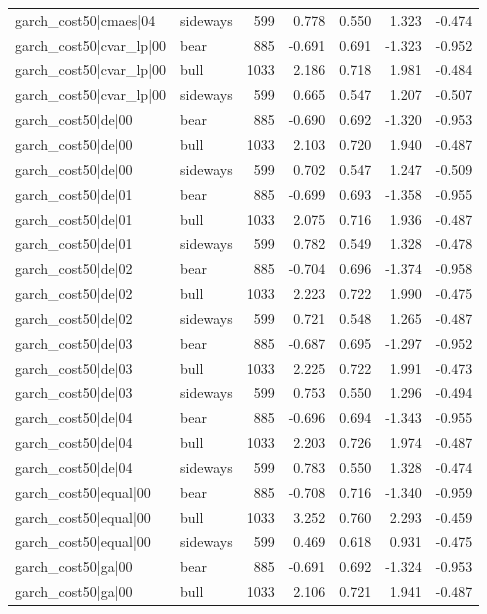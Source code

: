 \begin{table}
\begin{tabular}{llrrrrr}
garch\_cost50|cmaes|04 & sideways & 599 & 0.778 & 0.550 & 1.323 & -0.474 \\
garch\_cost50|cvar\_lp|00 & bear & 885 & -0.691 & 0.691 & -1.323 & -0.952 \\
garch\_cost50|cvar\_lp|00 & bull & 1033 & 2.186 & 0.718 & 1.981 & -0.484 \\
garch\_cost50|cvar\_lp|00 & sideways & 599 & 0.665 & 0.547 & 1.207 & -0.507 \\
garch\_cost50|de|00 & bear & 885 & -0.690 & 0.692 & -1.320 & -0.953 \\
garch\_cost50|de|00 & bull & 1033 & 2.103 & 0.720 & 1.940 & -0.487 \\
garch\_cost50|de|00 & sideways & 599 & 0.702 & 0.547 & 1.247 & -0.509 \\
garch\_cost50|de|01 & bear & 885 & -0.699 & 0.693 & -1.358 & -0.955 \\
garch\_cost50|de|01 & bull & 1033 & 2.075 & 0.716 & 1.936 & -0.487 \\
garch\_cost50|de|01 & sideways & 599 & 0.782 & 0.549 & 1.328 & -0.478 \\
garch\_cost50|de|02 & bear & 885 & -0.704 & 0.696 & -1.374 & -0.958 \\
garch\_cost50|de|02 & bull & 1033 & 2.223 & 0.722 & 1.990 & -0.475 \\
garch\_cost50|de|02 & sideways & 599 & 0.721 & 0.548 & 1.265 & -0.487 \\
garch\_cost50|de|03 & bear & 885 & -0.687 & 0.695 & -1.297 & -0.952 \\
garch\_cost50|de|03 & bull & 1033 & 2.225 & 0.722 & 1.991 & -0.473 \\
garch\_cost50|de|03 & sideways & 599 & 0.753 & 0.550 & 1.296 & -0.494 \\
garch\_cost50|de|04 & bear & 885 & -0.696 & 0.694 & -1.343 & -0.955 \\
garch\_cost50|de|04 & bull & 1033 & 2.203 & 0.726 & 1.974 & -0.487 \\
garch\_cost50|de|04 & sideways & 599 & 0.783 & 0.550 & 1.328 & -0.474 \\
garch\_cost50|equal|00 & bear & 885 & -0.708 & 0.716 & -1.340 & -0.959 \\
garch\_cost50|equal|00 & bull & 1033 & 3.252 & 0.760 & 2.293 & -0.459 \\
garch\_cost50|equal|00 & sideways & 599 & 0.469 & 0.618 & 0.931 & -0.475 \\
garch\_cost50|ga|00 & bear & 885 & -0.691 & 0.692 & -1.324 & -0.953 \\
garch\_cost50|ga|00 & bull & 1033 & 2.106 & 0.721 & 1.941 & -0.487 \\

\end{tabular}
\end{table}
